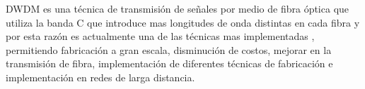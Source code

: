 \documentclass[10pt,journal,compsoc]{IEEEtran}
\begin{document}
 DWDM es una técnica de transmisión de señales por medio de fibra óptica que utiliza la banda C que introduce mas longitudes de onda distintas en cada fibra y por esta razón es actualmente una de las técnicas mas implementadas , permitiendo fabricación a gran escala, disminución de costos, mejorar en la transmisión de fibra, implementación de diferentes técnicas de fabricación e implementación en redes de larga distancia.  






%


%


\end{document}
